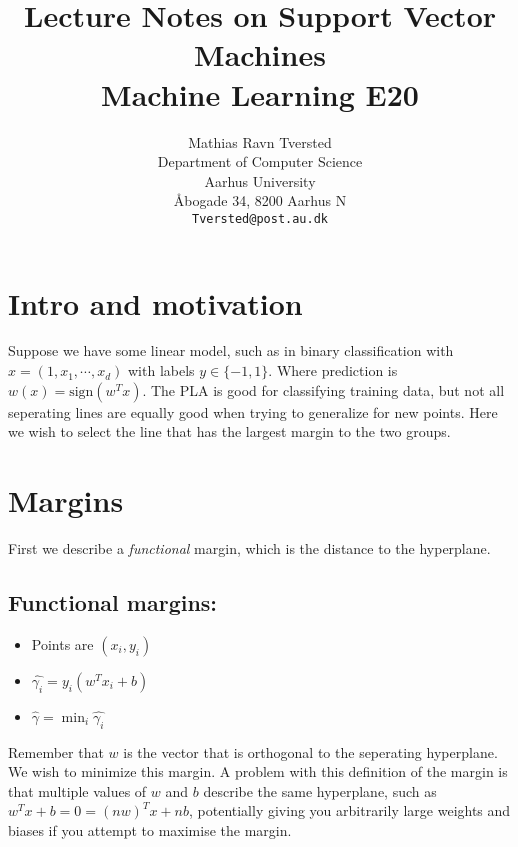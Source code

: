 \documentclass{article}
\title{Lecture Notes on Support Vector Machines\\Machine Learning E20}
\author{
 Mathias Ravn Tversted \\
  Department of Computer Science\\
  Aarhus University\\
  Åbogade 34, 8200 Aarhus N \\
  \texttt{Tversted@post.au.dk} \\
}
\begin{document}
\maketitle
\tableofcontents
\newpage



\section{Intro and motivation}
  Suppose we have some linear model, such as in binary classification with $x = (1, x_1, \cdots, x_d)$ with labels $y \in \{-1, 1\}$. Where prediction is $w(x) = \text{sign}(w^T x)$. The PLA is good for classifying training data, but not all seperating lines are equally good when trying to generalize for new points. Here we wish to select the line that has the largest margin to the two groups.

\section{Margins}
  First we describe a \emph{functional} margin, which is the distance to the hyperplane.

  \subsection{Functional margins:}
    \begin{itemize}
      \item Points are $(x_i, y_i)$
      \item $\hat{\gamma_i} = y_i(w^T x_i + b)$
      \item $\hat{\gamma} = {\min}_{i} \hat{\gamma_i}$
    \end{itemize}
    Remember that $w$ is the vector that is orthogonal to the seperating hyperplane. We wish to minimize this margin.
    A problem with this definition of the margin is that multiple values of $w$ and $b$ describe the same hyperplane, such as $w^Tx + b = 0 = (n w)^T x + n b$,
    potentially giving you arbitrarily large weights and biases if you attempt to maximise the margin.\\
\end{document}
